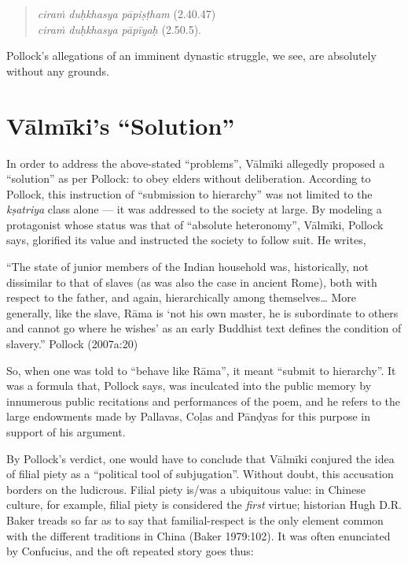 \newpage

\begin{quote}
{\sl ciraṁ duḥkhasya pāpiṣṭham}\label{verse18} (2.40.47)\\ 
{\sl ciraṁ duḥkhasya pāpīyaḥ}\label{verse19} (2.50.5). 
\end{quote}

Pollock’s allegations of an imminent dynastic struggle, we see, are absolutely without any grounds. 

\section{Vālmīki’s “Solution”}\label{sec1.3}

In order to address the above-stated “problems”, Vālmīki allegedly proposed a “solution” as per Pollock: to obey elders without deliberation. According to Pollock, this instruction of “submission to hierarchy” was not limited to the {\sl kṣatriya} class alone --- it was addressed to the society at large. By modeling a protagonist whose status was that of “absolute heteronomy”, Vālmīki, Pollock says, glorified its value and instructed the society to follow suit. He writes,

\begin{myquote}
“The state of junior members of the Indian household was, historically, not dissimilar to that of slaves (as was also the case in ancient Rome), both with respect to the father, and again, hierarchically among themselves… More generally, like the slave, Rāma is ‘not his own master, he is subordinate to others and cannot go where he wishes’ as an early Buddhist text defines the condition of slavery.” 				                                        
\hfill Pollock (2007a:20)
\end{myquote}

So, when one was told to “behave like Rāma”, it meant “submit to hierarchy”. It was a formula that, Pollock says, was inculcated into the public memory by innumerous public recitations and performances of the poem, and he refers to the large endowments made by Pallavas, Coḷas and Pānḍyas for this purpose in support of his argument.

By Pollock’s verdict, one would have to conclude that Vālmīki conjured the idea of filial piety as a “political tool of subjugation”. Without doubt, this accusation borders on the ludicrous. Filial piety is/was a ubiquitous value: in Chinese culture, for example, filial piety is considered the {\sl first} virtue; historian Hugh D.R. Baker treads so far as to say that familial-respect is the only element common with the different traditions in China (Baker 1979:102). It was often enunciated by Confucius, and the oft repeated story goes thus: 

